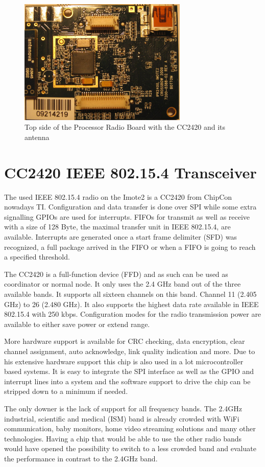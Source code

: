 \begin{figure}
  \begin{center}
    \includegraphics[height=6cm]{images/imote_top_cutted}
    \caption{Top side of the Processor Radio Board with the CC2420 and its antenna}
        \label{fig:imote2top}
  \end{center}
\end{figure}

\section{CC2420 IEEE 802.15.4 Transceiver}
The used IEEE 802.15.4 radio on the Imote2 is a CC2420 from ChipCon nowadays TI.
Configuration and data transfer is done over SPI while some extra signalling
GPIOs are used for interrupts. FIFOs for transmit as well as receive with a size
of 128 Byte, the maximal transfer unit in IEEE 802.15.4, are available. Interrupts
are generated once a start frame delimiter (SFD) was recognized, a full package
arrived in the FIFO or when a FIFO is going to reach a specified threshold.

The CC2420 is a full-function device (FFD) and as such can be used as
coordinator or normal node. It only uses the 2.4 GHz band out of the three
available bands. It supports all sixteen channels on this band. Channel 11
(2.405 GHz) to 26 (2.480 GHz). It also supports the highest data rate available
in IEEE 802.15.4 with 250 kbps. Configuration modes for the radio transmission power
are available to either save power or extend range.

More hardware support is available for CRC checking, data encryption, clear
channel assignment, auto acknowledge, link quality indication and more. Due to
his extensive hardware support this chip is also used in a lot microcontroller
based systems. It is easy to integrate the SPI interface as well as the GPIO and
interrupt lines into a system and the software support to drive the chip can be
stripped down to a minimum if needed.

The only downer is the lack of support for all frequency bands. The 2.4GHz
industrial, scientific and medical (ISM) band is already crowded with WiFi
communication, baby monitors, home video streaming solutions and many other
technologies. Having a chip that would be able to use the other radio bands
would have opened the possibility to switch to a less crowded band and evaluate
the performance in contrast to the 2.4GHz band.
